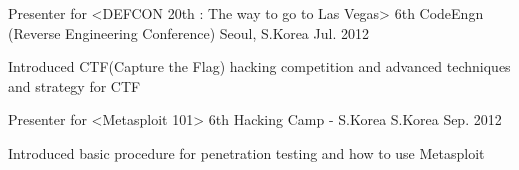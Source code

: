 

\begin{cventries}

  \cventry
    {Presenter for <DEFCON 20th : The way to go to Las Vegas>} %
    {6th CodeEngn (Reverse Engineering Conference)} %
    {Seoul, S.Korea} %
    {Jul. 2012} %
    {
      \begin{cvitems} %
        \item {Introduced CTF(Capture the Flag) hacking competition and advanced techniques and strategy for CTF}
      \end{cvitems}
    }

  \cventry
    {Presenter for <Metasploit 101>} %
    {6th Hacking Camp - S.Korea} %
    {S.Korea} %
    {Sep. 2012} %
    {
      \begin{cvitems} %
        \item {Introduced basic procedure for penetration testing and how to use Metasploit}
      \end{cvitems}
    }

\end{cventries}
